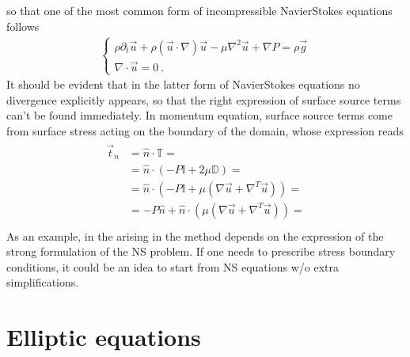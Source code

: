 \documentclass[letterpaper,10pt,english]{jupyterBook}
\begin{document}
\begin{itemize}
\begin{equation*}
\end{equation*}
\sphinxAtStartPar
so that one of the most common form of incompressible Navier\sphinxhyphen{}Stokes equations follows
\begin{equation*}
\begin{split}\begin{cases}
    \rho \partial_t \vec{u} + \rho ( \vec{u} \cdot \nabla ) \vec{u} - \mu \nabla^2 \vec{u} + \nabla P = \rho \vec{g} \\
    \nabla \cdot \vec{u} = 0 \ .
  \end{cases}\end{split}
\end{equation*}
\sphinxAtStartPar
It should be evident that in the latter form of Navier\sphinxhyphen{}Stokes equations no divergence explicitly appears, so that the right expression of surface source terms can’t be found immediately. In momentum equation, surface source terms come from surface stress acting on the boundary of the domain, whose expression reads
\begin{equation*}
\begin{split}\begin{aligned}
    \vec{t}_n 
    & = \hat{n} \cdot \mathbb{T} = \\
    & = \hat{n} \cdot \left(- P \mathbb{I} + 2 \mu \mathbb{D} \right) = \\
    & = \hat{n} \cdot \left(- P \mathbb{I} + \mu \left( \nabla \vec{u} + \nabla^T \vec{u} \right) \right) = \\
    & = - P \hat{n} +  \hat{n} \cdot \left( \mu \left( \nabla \vec{u} + \nabla^T \vec{u} \right) \right) = \\
  \end{aligned}\end{split}
\end{equation*}
\sphinxAtStartPar
As an example, in  the  arising in the method depends on the expression of the strong formulation of the NS problem. If one needs to prescribe stress boundary conditions, it could be an idea to start from NS equations w/o extra simplifications.

\end{itemize}

\sphinxstepscope


\chapter{Elliptic equations}
\label{\detokenize{ch/pde/elliptic:elliptic-equations}}\label{\detokenize{ch/pde/elliptic:pde-elliptic}}\label{\detokenize{ch/pde/elliptic::doc}}
\end{document}
